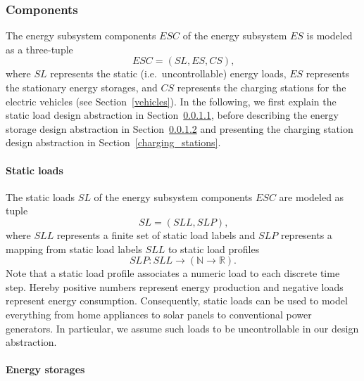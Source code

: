 
\subsubsection{Components}
\label{components}

The energy subsystem components $ESC$ of the energy subsystem $ES$ is modeled as a three-tuple
\[
	ESC = (SL, ES, CS) \textrm{,}
\]
where $SL$ represents the static (i.e.\ uncontrollable) energy loads, $ES$ represents the stationary energy storages, and $CS$ represents the charging stations for the electric vehicles (see Section~\ref{vehicles}). In the following, we first explain the static load design abstraction in Section~\ref{static_loads}, before describing the energy storage design abstraction in Section~\ref{energy_storages} and presenting the charging station design abstraction in Section~\ref{charging_stations}.

\paragraph{Static loads}
\label{static_loads}

The static loads $SL$ of the energy subsystem components $ESC$ are modeled as tuple
\[
	SL = (SLL, SLP) \textrm{,}
\]
where $SLL$ represents a finite set of static load labels and $SLP$ represents a mapping from static load labels $SLL$ to static load profiles
\[
	SLP: SLL \rightarrow (\mathbb{N} \rightarrow \mathbb{R}) \textrm{.}
\]
Note that a static load profile associates a numeric load to each discrete time step. Hereby positive numbers represent energy production and negative loads represent energy consumption. Consequently, static loads can be used to model everything from home appliances to solar panels to conventional power generators. In particular, we assume such loads to be uncontrollable in our design abstraction.


\paragraph{Energy storages}
\label{energy_storages}

